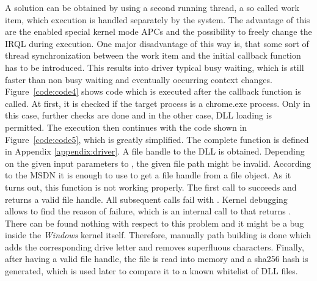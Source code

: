 A solution can be obtained by using a second running thread, a so called work item, which execution is handled separately by the system. The advantage of this are the enabled special kernel mode \glspl{APC} and the possibility to freely change the \gls{IRQL} during execution. One major disadvantage of this way is, that some sort of thread synchronization between the work item and the initial callback function has to be introduced. This results into driver typical busy waiting, which is still faster than non busy waiting and eventually occurring context changes. Figure~\ref{code:code4} shows code which is executed after the callback function is called. At first, it is checked if the target process is a chrome.exe process. Only in this case, further checks are done and in the other case, \gls{DLL} loading is permitted. The execution then continues with the code shown in Figure~\ref{code:code5}, which is greatly simplified. The complete function is defined in Appendix \ref{appendix:driver}. A file handle to the \gls{DLL} is obtained. Depending on the given input parameters to , the given file path might be invalid. According to the \gls{MSDN} it is enough to use  to get a file handle from a file object. As it turns out, this function is not working properly. The first call to  succeeds and returns a valid file handle. All subsequent calls fail with . Kernel debugging allows to find the reason of failure, which is an internal call to  that returns . There can be found nothing with respect to this problem and it might be a bug inside the \emph{Windows} kernel itself. Therefore, manually path building is done which adds the corresponding drive letter and removes superfluous characters. Finally, after having a valid file handle, the file is read into memory and a sha256 \cite{eckert2014sicherheit} hash is generated, which is used later to compare it to a known whitelist of \gls{DLL} files.

